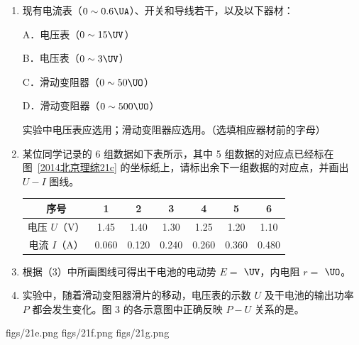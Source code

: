 \documentclass[\gkver]{gaokaozhenti}
\begin{document}
\begin{enumerate}
\begin{enumerate}
	{figs/21b.png}
	\item
	现有电流表（$0\sim0.6\UA$）、开关和导线若干，以及以下器材：

	A．电压表（$0\sim15\UV$）

	B．电压表（$0\sim3\UV$）

	C．滑动变阻器（$0\sim50\UO$）

	D．滑动变阻器（$0\sim500\UO$）

	实验中电压表应选用；滑动变阻器应选用。（选填相应器材前的字母）
	\item
	某位同学记录的 6 组数据如下表所示，其中 5 组数据的对应点已经标在图~\ref{2014北京理综21c} 的坐标纸上，请标出余下一组数据的对应点，并画出 $U-I$ 图线。

	\begin{center}
	\begin{tabular}{|c|c|c|c|c|c|c|}
	\hline
	序号 & 1 & 2 & 3 & 4 & 5 & 6 \\
	\hline
	电压 $U$（V） & 1.45 & 1.40 & 1.30 & 1.25 & 1.20 & 1.10 \\
	\hline
	电流 $I$（A） & 0.060 & 0.120 & 0.240 & 0.260 & 0.360 & 0.480 \\
	\hline
	\end{tabular}
	\end{center}

	\item
	根据（3）中所画图线可得出干电池的电动势 $E=$ $\UV$，内电阻 $r=$ $\UO$。
	\item
	实验中，随着滑动变阻器滑片的移动，电压表的示数 $U$ 及干电池的输出功率 $P$ 都会发生变化。图 3 的各示意图中正确反映 $P-U$ 关系的是。
\end{enumerate}

{figs/21e.png}
{figs/21f.png}
{figs/21g.png}

\end{enumerate}
\end{document}
